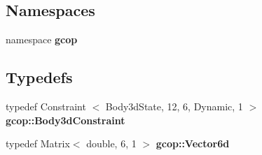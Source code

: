 \subsection*{\-Namespaces}
\begin{DoxyCompactItemize}
\item 
namespace {\bf gcop}
\end{DoxyCompactItemize}
\subsection*{\-Typedefs}
\begin{DoxyCompactItemize}
\item 
typedef \-Constraint\*
$<$ \-Body3d\-State, 12, 6, \-Dynamic, 1 $>$ {\bf gcop\-::\-Body3d\-Constraint}
\item 
typedef \-Matrix$<$ double, 6, 1 $>$ {\bf gcop\-::\-Vector6d}
\end{DoxyCompactItemize}
